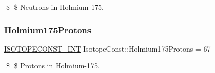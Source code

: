 \$ \$ Neutrons in Holmium-\/175. \mbox{\label{group___isotope_const-_holmium-_ho175_gae7610e2ecb02768ef368c4894101108d}} 
\subsubsection{\texorpdfstring{Holmium175\+Protons}{Holmium175Protons}}
{\footnotesize\ttfamily \mbox{\hyperlink{group___isotope_const-_macros_ga5f18360b3e99483a35c32d789e62621c}{I\+S\+O\+T\+O\+P\+E\+C\+O\+N\+S\+T\+\_\+\+I\+NT}} Isotope\+Const\+::\+Holmium175\+Protons = 67}

\$ \$ Protons in Holmium-\/175. 